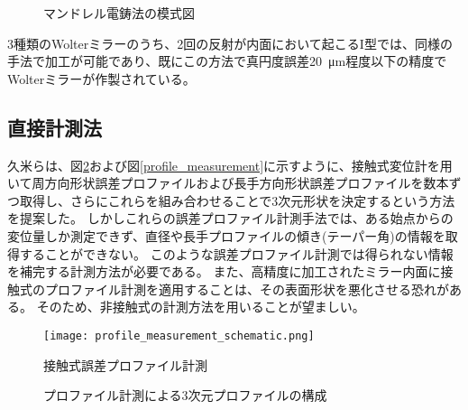 \begin{figure}[!ht]
\centering
{}
\caption[]{マンドレル電鋳法の模式図}
\label{fig:mandrel_plating_pictures}
\end{figure}

3種類のWolterミラーのうち、2回の反射が内面において起こるI型では、同様の手法で加工が可能であり、既にこの方法で真円度誤差\SI{20}{\micro \metre}程度以下の精度でWolterミラーが作製されている。\cite{Egawa2019}

\subsection{直接計測法}
\label{chap1_direct_measurement}

久米らは、図\ref{fig:profile_measurement_schematic}および図\ref{profile_measurement}に示すように、接触式変位計を用いて周方向形状誤差プロファイルおよび長手方向形状誤差プロファイルを数本ずつ取得し、さらにこれらを組み合わせることで3次元形状を決定するという方法を提案した。\cite{Kume2017}
しかしこれらの誤差プロファイル計測手法では、ある始点からの変位量しか測定できず、直径や長手プロファイルの傾き(テーパー角)の情報を取得することができない。
このような誤差プロファイル計測では得られない情報を補完する計測方法が必要である。
また、高精度に加工されたミラー内面に接触式のプロファイル計測を適用することは、その表面形状を悪化させる恐れがある。
そのため、非接触式の計測方法を用いることが望ましい。

\begin{figure}[h]
\centering
\texttt{[image: profile\_measurement\_schematic.png]}
\caption{接触式誤差プロファイル計測}
\label{fig:profile_measurement_schematic}
\end{figure}

\begin{figure}[!ht]
\centering
{}
\caption[]{プロファイル計測による3次元プロファイルの構成}
\label{fig:profile_measurement}
\end{figure}



